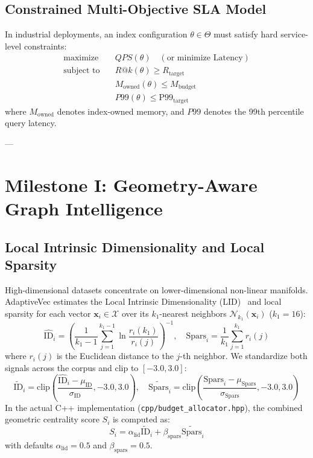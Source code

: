 \documentclass[10pt,journal,compsoc]{IEEEtran}
\begin{document}
\subsection{Constrained Multi-Objective SLA Model}
In industrial deployments, an index configuration $\theta \in \Theta$ must satisfy hard service-level constraints:
\begin{align}
\text{maximize} \quad & QPS(\theta) \quad (\text{or minimize } \text{Latency}) \\
\text{subject to} \quad & R@k(\theta) \ge R_{\text{target}} \label{eq:sla_recall} \\
& M_{\text{owned}}(\theta) \le M_{\text{budget}} \label{eq:sla_mem} \\
& P99(\theta) \le \text{P99}_{\text{target}} \label{eq:sla_p99}
\end{align}
where $M_{\text{owned}}$ denotes index-owned memory, and $P99$ denotes the 99th percentile query latency.

---

\section{Milestone I: Geometry-Aware Graph Intelligence}
\label{sec:geometry}

\subsection{Local Intrinsic Dimensionality and Local Sparsity}
High-dimensional datasets concentrate on lower-dimensional non-linear manifolds. AdaptiveVec estimates the Local Intrinsic Dimensionality (LID)~\cite{levina2004maximum, houle2017local} and local sparsity for each vector $\mathbf{x}_i \in \mathcal{X}$ over its $k_1$-nearest neighbors $\mathcal{N}_{k_1}(\mathbf{x}_i)$ ($k_1=16$):
\begin{equation}
\label{eq:lid_est}
\widehat{\text{ID}}_i = \left( \frac{1}{k_1 - 1} \sum_{j=1}^{k_1 - 1} \ln \frac{r_i(k_1)}{r_i(j)} \right)^{-1}, \quad \text{Spars}_i = \frac{1}{k_1} \sum_{j=1}^{k_1} r_i(j)
\end{equation}
where $r_i(j)$ is the Euclidean distance to the $j$-th neighbor. We standardize both signals across the corpus and clip to $[-3.0, 3.0]$:
\begin{equation}
\tilde{\text{ID}}_i = \text{clip}\left( \frac{\widehat{\text{ID}}_i - \mu_{\text{ID}}}{\sigma_{\text{ID}}}, -3.0, 3.0 \right), \quad \tilde{\text{Spars}}_i = \text{clip}\left( \frac{\text{Spars}_i - \mu_{\text{Spars}}}{\sigma_{\text{Spars}}}, -3.0, 3.0 \right)
\end{equation}
In the actual C++ implementation (\texttt{cpp/budget\_allocator.hpp}), the combined geometric centrality score $S_i$ is computed as:
\begin{equation}
S_i = \alpha_{\text{lid}} \tilde{\text{ID}}_i + \beta_{\text{spars}} \tilde{\text{Spars}}_i
\end{equation}
with defaults $\alpha_{\text{lid}} = 0.5$ and $\beta_{\text{spars}} = 0.5$.
\end{document}
